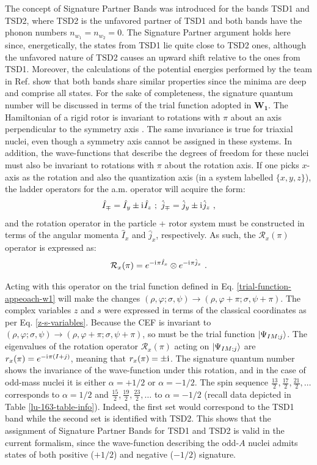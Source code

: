 The concept of Signature Partner Bands was introduced for the bands TSD1 and TSD2, where TSD2 is the unfavored partner of TSD1 and both bands have the phonon numbers $n_{w_1}=n_{w_2}=0$. The Signature Partner argument holds here since, energetically, the states from TSD1 lie quite close to TSD2 ones, although the unfavored nature of TSD2 causes an upward shift relative to the ones from TSD1. Moreover, the calculations of the potential energies performed by the team in Ref. \cite{raduta2017semiclassical} show that both bands share similar properties since the minima are deep and comprise all states. For the sake of completeness, the signature quantum number will be discussed in terms of the trial function adopted in $\mathbf{W_1}$. The Hamiltonian of a rigid rotor is invariant to rotations with $\pi$ about an axis perpendicular to the symmetry axis \cite{bohr1998nuclear}. The same invariance is true for triaxial nuclei, even though a symmetry axis cannot be assigned in these systems. In addition, the wave-functions that describe the degrees of freedom for these nuclei must also be invariant to rotations with $\pi$ about the rotation axis. If one picks $x$-axis as the rotation and also the quantization axis (in a system labelled $\{x,y,z\}$), the ladder operators for the a.m. operator will acquire the form:
\begin{align}
    \hat{I}_\mp=\hat{I}_y\pm\iu\hat{I}_z\ ;\ \hat{j}_\mp=\hat{j}_y\pm\iu\hat{j}_z\ ,
\end{align}
and the rotation operator in the particle + rotor system must be constructed in terms of the angular momenta $\hat{I}_x$ and $\hat{j}_x$, respectively. As such, the $\mathcal{R}_x(\pi)$ operator is expressed as:
\begin{align}
    \mathcal{R}_x(\pi)=e^{-\iu\pi\hat{I}_x}\otimes e^{-\iu\pi\hat{j}_x}\ .
\end{align}

Acting with this operator on the trial function defined in Eq. \ref{trial-function-appeoach-w1} will make the changes $(\rho,\varphi;\sigma,\psi)\to(\rho,\varphi+\pi;\sigma,\psi+\pi)$. The complex variables $z$ and $s$ were expressed in terms of the classical coordinates as per Eq. \ref{z-s-variables}. Because the CEF is invariant to $(\rho,\varphi;\sigma,\psi)\to(\rho,\varphi+\pi;\sigma,\psi+\pi)$, so must be the trial function $\ket{\Psi_{IM;j}}$. The eigenvalues of the rotation operator $\mathcal{R}_x(\pi)$ acting on $\ket{\Psi_{IM;j}}$ are $r_x(\pi)=e^{-\mathrm{i}\mkern1mu\pi(I+j)}$, meaning that $r_x(\pi)=\pm\mathrm{i}\mkern1mu$. The signature quantum number shows the invariance of the wave-function under this rotation, and in the case of odd-mass nuclei it is either $\alpha=+1/2$ or $\alpha=-1/2$. The spin sequence $\frac{13}{2},\frac{17}{2},\frac{21}{2},\dots$ corresponds to $\alpha=1/2$ and $\frac{15}{2},\frac{19}{2},\frac{23}{2},\dots$ to $\alpha=-1/2$ (recall data depicted in Table \ref{lu-163-table-info}). Indeed, the first set would correspond to the TSD1 band while the second set is identified with TSD2. This shows that the assignment of Signature Partner Bands for TSD1 and TSD2 is valid in the current formalism, since the wave-function describing the odd-$A$ nuclei admits states of both positive ($+1/2$) and negative ($-1/2$) signature.

